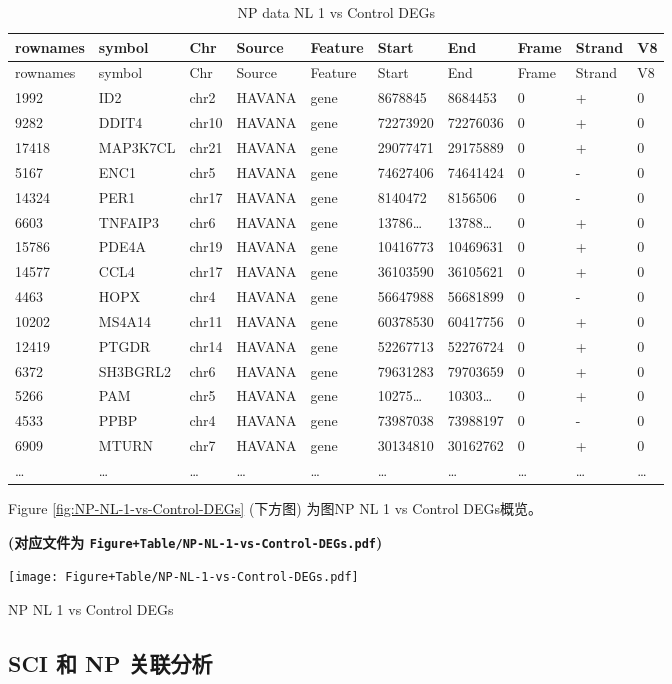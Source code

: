 \documentclass[
]{article}
\begin{document}
\begin{longtable}[]{@{}llllllllll@{}}
\caption{\label{tab:NP-data-NL-1-vs-Control-DEGs}NP data NL 1 vs Control DEGs}\tabularnewline
\toprule
rownames & symbol & Chr & Source & Feature & Start & End & Frame & Strand & V8\tabularnewline
\midrule
\endfirsthead
\toprule
rownames & symbol & Chr & Source & Feature & Start & End & Frame & Strand & V8\tabularnewline
\midrule
\endhead
1992 & ID2 & chr2 & HAVANA & gene & 8678845 & 8684453 & 0 & + & 0\tabularnewline
9282 & DDIT4 & chr10 & HAVANA & gene & 72273920 & 72276036 & 0 & + & 0\tabularnewline
17418 & MAP3K7CL & chr21 & HAVANA & gene & 29077471 & 29175889 & 0 & + & 0\tabularnewline
5167 & ENC1 & chr5 & HAVANA & gene & 74627406 & 74641424 & 0 & - & 0\tabularnewline
14324 & PER1 & chr17 & HAVANA & gene & 8140472 & 8156506 & 0 & - & 0\tabularnewline
6603 & TNFAIP3 & chr6 & HAVANA & gene & 13786\ldots{} & 13788\ldots{} & 0 & + & 0\tabularnewline
15786 & PDE4A & chr19 & HAVANA & gene & 10416773 & 10469631 & 0 & + & 0\tabularnewline
14577 & CCL4 & chr17 & HAVANA & gene & 36103590 & 36105621 & 0 & + & 0\tabularnewline
4463 & HOPX & chr4 & HAVANA & gene & 56647988 & 56681899 & 0 & - & 0\tabularnewline
10202 & MS4A14 & chr11 & HAVANA & gene & 60378530 & 60417756 & 0 & + & 0\tabularnewline
12419 & PTGDR & chr14 & HAVANA & gene & 52267713 & 52276724 & 0 & + & 0\tabularnewline
6372 & SH3BGRL2 & chr6 & HAVANA & gene & 79631283 & 79703659 & 0 & + & 0\tabularnewline
5266 & PAM & chr5 & HAVANA & gene & 10275\ldots{} & 10303\ldots{} & 0 & + & 0\tabularnewline
4533 & PPBP & chr4 & HAVANA & gene & 73987038 & 73988197 & 0 & - & 0\tabularnewline
6909 & MTURN & chr7 & HAVANA & gene & 30134810 & 30162762 & 0 & + & 0\tabularnewline
\ldots{} & \ldots{} & \ldots{} & \ldots{} & \ldots{} & \ldots{} & \ldots{} & \ldots{} & \ldots{} & \ldots{}\tabularnewline
\bottomrule
\end{longtable}

Figure \ref{fig:NP-NL-1-vs-Control-DEGs} (下方图) 为图NP NL 1 vs Control DEGs概览。

\textbf{(对应文件为 \texttt{Figure+Table/NP-NL-1-vs-Control-DEGs.pdf})}

\def\@captype{figure}
\begin{center}
\texttt{[image: Figure+Table/NP-NL-1-vs-Control-DEGs.pdf]}
\caption{NP NL 1 vs Control DEGs}\label{fig:NP-NL-1-vs-Control-DEGs}
\end{center}

\hypertarget{sci-ux548c-np-ux5173ux8054ux5206ux6790-1}{%
\subsection{SCI 和 NP 关联分析}\label{sci-ux548c-np-ux5173ux8054ux5206ux6790-1}}
\end{document}
